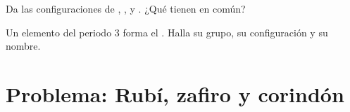 \begin{exercise}[$\star\star\star$]\label{exo:g10:electron-shells:14}
Da las configuraciones de , ,  y
. ¿Qué tienen en común?
\end{exercise}

\begin{exercise}[$\star\star\star$]\label{exo:g10:electron-shells:15}
Un elemento del periodo 3 forma el  . Halla su grupo, su
configuración y su nombre.
\end{exercise}

\section{Problema: Rubí, zafiro y corindón}

